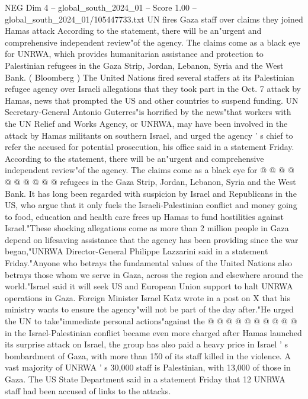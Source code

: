 \begin{textsample}{NEG Dim 4 – global\_south\_2024\_01 – Score 1.00 – global\_south\_2024\_01/105447733.txt}  \label{ex:f4_neg_089}
UN fires Gaza staff over claims they joined Hamas attack According to the statement, there will be an"urgent and comprehensive independent review"of the agency.
The claims come as a black eye for UNRWA, which provides humanitarian assistance and protection to Palestinian refugees in the Gaza Strip, Jordan, Lebanon, Syria and the West Bank. ( Bloomberg ) The United Nations fired several staffers at its Palestinian refugee agency over Israeli allegations that they took part in the Oct. 7 attack by Hamas, news that prompted the US and other countries to suspend funding.
UN Secretary-General Antonio Guterres"is horrified by the news"that workers with the UN Relief and Works Agency, or UNRWA, may have been involved in the attack by Hamas militants on southern Israel, and urged the agency ' s chief to refer the accused for potential prosecution, his office said in a statement Friday.
According to the statement, there will be an"urgent and comprehensive independent review"of the agency.
The claims come as a black eye for @ @ @ @ @ @ @ @ @ @ refugees in the Gaza Strip, Jordan, Lebanon, Syria and the West Bank.
It has long been regarded with suspicion by Israel and Republicans in the US, who argue that it only fuels the Israeli-Palestinian conflict and money going to food, education and health care frees up Hamas to fund hostilities against Israel."These shocking allegations come as more than 2 million people in Gaza depend on lifesaving assistance that the agency has been providing since the war began,"UNRWA Director-General Philippe Lazzarini said in a statement Friday."Anyone who betrays the fundamental values of the United Nations also betrays those whom we serve in Gaza, across the region and elsewhere around the world."Israel said it will seek US and European Union support to halt UNRWA operations in Gaza.
Foreign Minister Israel Katz wrote in a post on X that his ministry wants to ensure the agency"will not be part of the day after."He urged the UN to take"immediate personal actions"against the @ @ @ @ @ @ @ @ @ @ in the Israel-Palestinian conflict became even more charged after Hamas launched its surprise attack on Israel, the group has also paid a heavy price in Israel ' s bombardment of Gaza, with more than 150 of its staff killed in the violence.
A vast majority of UNRWA ' s 30,000 staff is Palestinian, with 13,000 of those in Gaza.
The US State Department said in a statement Friday that 12 UNRWA staff had been accused of links to the attacks.

\end{textsample}
